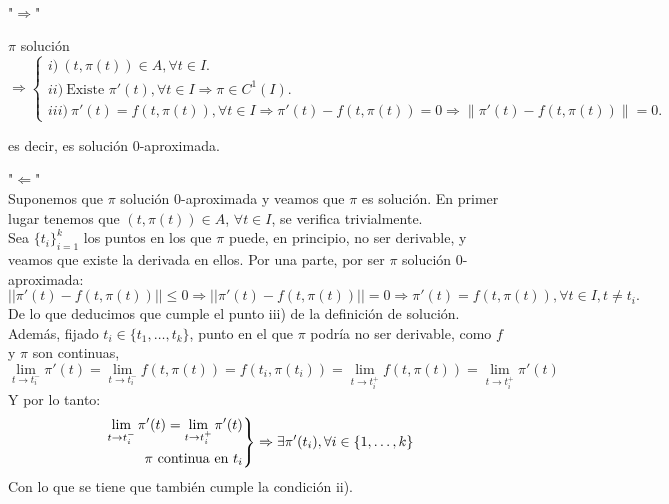 \documentclass[11pt, a4paper,twoside]{article}
\makeatletter
\theoremstyle{theorem-style}  %
\renewenvironment{proof}[1][\proofname]{\par
	\pushQED{\qed}%
	\normalfont \topsep6\p@\@plus6\p@\relax
	\list{}{%
		\settowidth{\leftmargin}{\quad:\hskip\labelsep}%
		\setlength{\labelwidth}{0pt}%
		\setlength{\itemindent}{-\leftmargin}%
	}%
	\item[\hskip\labelsep\itshape#1\@addpunct{:}]\ignorespaces
}{%
	\popQED\endlist\@endpefalse
}
\theoremstyle{definition-style}
\theoremstyle{example-style}
\providecommand{\norm}[1]{\left\lVert#1\right\rVert} %
\newenvironment{rcases}
{\left.\begin{aligned}}
	{\end{aligned}\right\rbrace}
\makeatother
\begin{document}
\begin{proof}\ \\
	"$ \Rightarrow $"
	
	$ \pi $	solución $\Rightarrow \begin{cases}
	i)\  (t, \pi (t)) \in A, \forall t \in I.\\
	ii)\  \text{Existe }  \pi' (t), \forall t \in I \Rightarrow \pi \in C^1(I). \\
	iii)\  \pi'(t)=f(t, \pi(t)),  \forall t \in I \Rightarrow \pi'(t)-f(t, \pi(t))=0 \Rightarrow \norm{\pi'(t)-f(t, \pi(t))}=0.
	\end{cases}$ 
	
	es decir, es solución 0-aproximada.
	
	"$ \Leftarrow $" \\Suponemos que $ \pi $ solución 0-aproximada y veamos que $ \pi $ es solución. En primer lugar tenemos que $(t, \pi (t)) \in A$, $\forall t \in I$, se verifica trivialmente. \\
	Sea $ \{t_i\}_{i=1}^k $ los puntos en los que $ \pi $ puede, en principio, no ser derivable, y veamos que existe la derivada en ellos. Por una parte, por ser  $ \pi $ solución 0-aproximada:
	 \[ ||\pi'(t)-f(t,\pi(t))||\leq 0\Rightarrow ||\pi'(t)-f(t,\pi(t))||=0 \Rightarrow \pi'(t)=f(t, \pi(t)), \forall t \in I, t\neq t_i.\]
	De lo que deducimos que cumple el punto iii) de la definición de solución. Además, fijado $ t_i\in \{t_1, \dots, t_k\} $, punto en el que $ \pi $ podría no ser derivable, como $ f $ y $ \pi $ son continuas, 
	\[ \lim\limits_{t\rightarrow t_i^-}\pi'(t)=\lim\limits_{t\rightarrow t_i^-} f(t, \pi(t))= f(t_i, \pi(t_i))= \lim\limits_{t\rightarrow t_i^+} f(t, \pi(t))=\lim\limits_{t\rightarrow t_i^+}\pi'(t)\]
	Y por lo tanto:
	\[ \begin{rcases}
	\lim\limits_{t\rightarrow t_i^-}\pi'(t)=\lim\limits_{t\rightarrow t_i^+}\pi'(t) \\
	\pi \text{ continua en } t_i
	\end{rcases}\Rightarrow \exists \pi'(t_i), \forall i \in \{1,\dots,k \} \]
	Con lo que se tiene que también cumple la condición ii).	
\end{proof}
\end{document}
